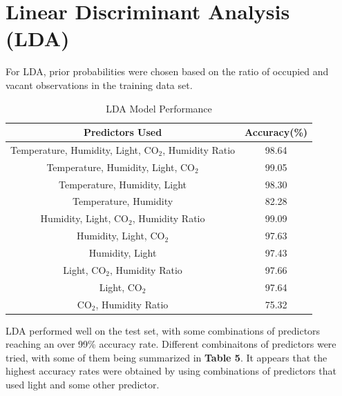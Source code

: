 \documentclass{article}
\begin{document}
\section{Linear Discriminant Analysis (LDA)}

\noindent For LDA, prior probabilities were chosen based on the ratio of occupied and vacant observations in the training data set. 

\begin{table}[H]
	\centering
	\caption{LDA Model Performance}
	\begin{tabular}{c|c}
	Predictors Used & Accuracy(\%) \\
	\hline\hline
	Temperature, Humidity, Light, CO$_2$, Humidity Ratio & 98.64 \\
	\hline
	Temperature, Humidity, Light, CO$_2$ & 99.05 \\
	\hline
	Temperature, Humidity, Light & 98.30 \\
	\hline
	Temperature, Humidity & 82.28 \\
	\hline
	Humidity, Light, CO$_2$, Humidity Ratio & 99.09 \\
	\hline
	Humidity, Light, CO$_2$ & 97.63 \\
	\hline
	Humidity, Light & 97.43 \\
	\hline
	Light, CO$_2$, Humidity Ratio & 97.66 \\
	\hline
	Light, CO$_2$ & 97.64 \\
	\hline
	CO$_2$, Humidity Ratio & 75.32 \\
	\end{tabular}
\end{table}

LDA performed well on the test set, with some combinations of predictors reaching an over 99\% accuracy rate. Different combinaitons of predictors were tried, with some of them being summarized in \textbf{Table 5}. It appears that the highest accuracy rates were obtained by using combinations of predictors that used light and some other predictor.
\end{document}
